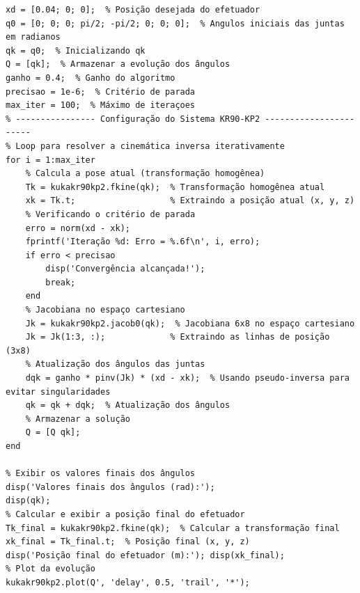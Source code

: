 \documentclass[10pt]{article}
\begin{document}
\newpage

\begin{lstlisting}[caption={Código do método iterativo da solução da cinemática inversa}, label={code:subsecao29}]
% Parâmetros iniciais
xd = [0.04; 0; 0];  % Posição desejada do efetuador
q0 = [0; 0; 0; pi/2; -pi/2; 0; 0; 0];  % Angulos iniciais das juntas em radianos
qk = q0;  % Inicializando qk
Q = [qk];  % Armazenar a evolução dos ângulos
ganho = 0.4;  % Ganho do algoritmo
precisao = 1e-6;  % Critério de parada
max_iter = 100;  % Máximo de iteraçoes
% ---------------- Configuração do Sistema KR90-KP2 -----------------------
% Loop para resolver a cinemática inversa iterativamente
for i = 1:max_iter
    % Calcula a pose atual (transformação homogênea)
    Tk = kukakr90kp2.fkine(qk);  % Transformação homogênea atual
    xk = Tk.t;                   % Extraindo a posição atual (x, y, z)
    % Verificando o critério de parada
    erro = norm(xd - xk);
    fprintf('Iteração %d: Erro = %.6f\n', i, erro);
    if erro < precisao
        disp('Convergência alcançada!');
        break;
    end
    % Jacobiana no espaço cartesiano
    Jk = kukakr90kp2.jacob0(qk);  % Jacobiana 6x8 no espaço cartesiano
    Jk = Jk(1:3, :);             % Extraindo as linhas de posição (3x8)
    % Atualização dos ângulos das juntas
    dqk = ganho * pinv(Jk) * (xd - xk);  % Usando pseudo-inversa para evitar singularidades
    qk = qk + dqk;  % Atualização dos ângulos
    % Armazenar a solução
    Q = [Q qk];
end

% Exibir os valores finais dos ângulos
disp('Valores finais dos ângulos (rad):');
disp(qk);
% Calcular e exibir a posição final do efetuador
Tk_final = kukakr90kp2.fkine(qk);  % Calcular a transformação final
xk_final = Tk_final.t;  % Posição final (x, y, z)
disp('Posição final do efetuador (m):'); disp(xk_final);
% Plot da evolução
kukakr90kp2.plot(Q', 'delay', 0.5, 'trail', '*');
\end{lstlisting}
\end{document}
